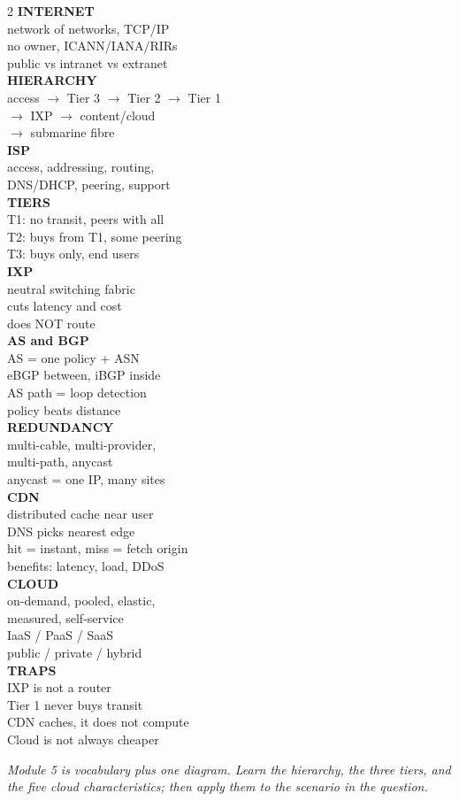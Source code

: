 \documentclass[11pt,a4paper]{article}
\begin{document}
\begin{multicols}{2}
\textbf{INTERNET}\\
network of networks, TCP/IP\\
no owner, ICANN/IANA/RIRs\\
public vs intranet vs extranet\\[5pt]
\textbf{HIERARCHY}\\
access $\to$ Tier 3 $\to$ Tier 2 $\to$ Tier 1\\
$\to$ IXP $\to$ content/cloud\\
$\to$ submarine fibre\\[5pt]
\textbf{ISP}\\
access, addressing, routing,\\
DNS/DHCP, peering, support\\[5pt]
\textbf{TIERS}\\
T1: no transit, peers with all\\
T2: buys from T1, some peering\\
T3: buys only, end users\\[5pt]
\textbf{IXP}\\
neutral switching fabric\\
cuts latency and cost\\
does NOT route\\[5pt]
\textbf{AS and BGP}\\
AS = one policy + ASN\\
eBGP between, iBGP inside\\
AS path = loop detection\\
policy beats distance\\[5pt]
\textbf{REDUNDANCY}\\
multi-cable, multi-provider,\\
multi-path, anycast\\
anycast = one IP, many sites\\[5pt]
\textbf{CDN}\\
distributed cache near user\\
DNS picks nearest edge\\
hit = instant, miss = fetch origin\\
benefits: latency, load, DDoS\\[5pt]
\textbf{CLOUD}\\
on-demand, pooled, elastic,\\
measured, self-service\\
IaaS / PaaS / SaaS\\
public / private / hybrid\\[5pt]
\textbf{TRAPS}\\
IXP is not a router\\
Tier 1 never buys transit\\
CDN caches, it does not compute\\
Cloud is not always cheaper
\end{multicols}

\vfill
\begin{center}\textit{Module 5 is vocabulary plus one diagram. Learn the hierarchy, the three tiers, and the five cloud characteristics; then apply them to the scenario in the question.}\end{center}
\end{document}
